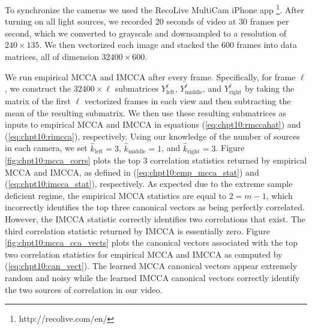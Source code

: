 To synchronize the cameras we used the RecoLive MultiCam iPhone app
\footnote{http://recolive.com/en/}. After turning on all light sources, we recorded 20
seconds of video at 30 frames per second, which we converted to grayscale and downsampled
to a resolution of $240\times 135$. We then vectorized each image and stacked the 600
frames into data matrices, all of dimension $32400 \times 600$.

We run empirical MCCA and IMCCA after every frame. Specifically, for frame $\ell$, we
construct the $32400\times \ell$ submatrices $Y_{\text{left}}^{\ell}$,
$Y_{\text{middle}}^{\ell}$, and $Y_{\text{right}}^{\ell}$ by taking the matrix of the
first $\ell$ vectorized frames in each view and then subtracting the mean of the resulting
submatrix. We then use these resulting submatrices as inputs to empirical MCCA and IMCCA
in equations (\ref{eq:chpt10:rmccahat}) and (\ref{eq:chpt10:rimcca}), respectively. Using
our knowledge of the number of sources in each camera, we set
$\widehat{k}_{\text{left}}=3$, $\widehat{k}_{\text{middle}}=1$, and
$\widehat{k}_{\text{right}}=3$. Figure \ref{fig:chpt10:mcca_corrs} plots the top 3
correlation statistics returned by empirical MCCA and IMCCA, as defined in
(\ref{eq:chpt10:emp_mcca_stat}) and (\ref{eq:chpt10:imcca_stat}), respectively. As
expected due to the extreme sample deficient regime, the empirical MCCA statistics are
equal to $2=m-1$, which incorrectly identifies the top three canonical vectors as being
perfectly correlated. However, the IMCCA statistic correctly identifies two correlations
that exist. The third correlation statistic returned by IMCCA is essentially zero. Figure
\ref{fig:chpt10:mcca_cca_vects} plots the canonical vectors associated with the top two
correlation statistics for empirical MCCA and IMCCA as computed by
(\ref{eq:chpt10:can_vect}). The learned MCCA canonical vectors appear extremely random and
noisy while the learned IMCCA canonical vectors correctly identify the two sources of
correlation in our video.

